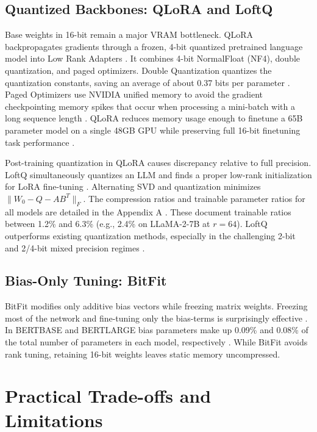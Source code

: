 \documentclass[11pt,a4paper]{article}
\begin{document}
\subsection{Quantized Backbones: QLoRA and LoftQ}
Base weights in 16-bit remain a major VRAM bottleneck. QLoRA backpropagates gradients through a frozen, 4-bit quantized pretrained language model into Low Rank Adapters \cite{dettmers2023qlora}. It combines 4-bit NormalFloat (NF4), double quantization, and paged optimizers. Double Quantization quantizes the quantization constants, saving an average of about 0.37 bits per parameter \cite{dettmers2023qlora}. Paged Optimizers use NVIDIA unified memory to avoid the gradient checkpointing memory spikes that occur when processing a mini-batch with a long sequence length \cite{dettmers2023qlora}. QLoRA reduces memory usage enough to finetune a 65B parameter model on a single 48GB GPU while preserving full 16-bit finetuning task performance \cite{dettmers2023qlora}.

Post-training quantization in QLoRA causes discrepancy relative to full precision. LoftQ simultaneously quantizes an LLM and finds a proper low-rank initialization for LoRA fine-tuning \cite{li2023loftq}. Alternating SVD and quantization minimizes $\|W_0 - Q - AB^T\|_F$. The compression ratios and trainable parameter ratios for all models are detailed in the Appendix A \cite{li2023loftq}. These document trainable ratios between 1.2\% and 6.3\% (e.g., 2.4\% on LLaMA-2-7B at $r=64$). LoftQ outperforms existing quantization methods, especially in the challenging 2-bit and 2/4-bit mixed precision regimes \cite{li2023loftq}.

\subsection{Bias-Only Tuning: BitFit}
BitFit modifies only additive bias vectors while freezing matrix weights. Freezing most of the network and fine-tuning only the bias-terms is surprisingly effective \cite{benzaken2021bitfit}. In BERTBASE and BERTLARGE bias parameters make up 0.09\% and 0.08\% of the total number of parameters in each model, respectively \cite{benzaken2021bitfit}. While BitFit avoids rank tuning, retaining 16-bit weights leaves static memory uncompressed.

\section{Practical Trade-offs and Limitations}
\end{document}

